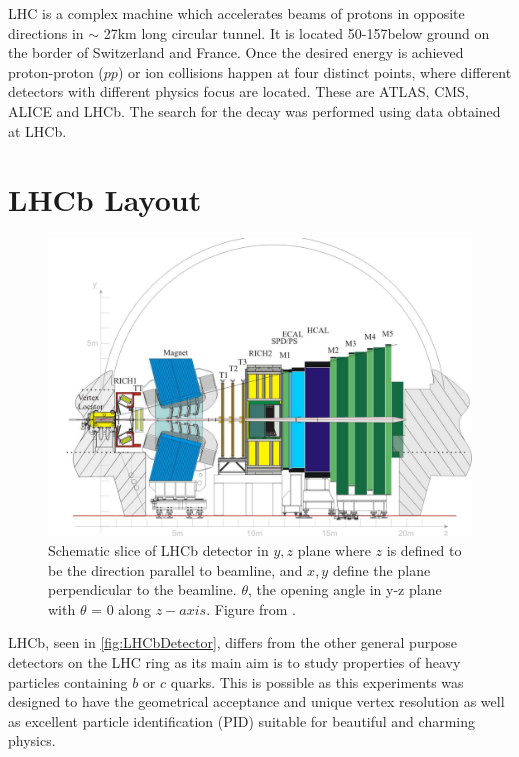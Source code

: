\Gls{LHC} is a complex machine which accelerates beams of protons in opposite directions in $\sim$ 27km long circular tunnel. It is located
50-157\m below ground on the border of Switzerland and France. Once the desired energy is achieved proton-proton ($pp$) or ion collisions happen at four distinct points, where different detectors with different physics focus are located. These are \Gls{ATLAS}, \Gls{CMS}, \Gls{ALICE} and \Gls{LHCb}. 
The search for the decay \Bmumumu was performed using data obtained at \Gls{LHCb}. 

\section{LHCb Layout }

\begin{figure}
	\centering
	\includegraphics[scale = 0.25]{figs/detector/lhcbdet.pdf}
	\caption{Schematic slice of \Gls{LHCb} detector in $y,z$ plane where $z$ is defined to be the direction parallel to beamline, and $x,y$ define the plane perpendicular to the beamline. $\theta$, the opening angle in y-z plane with $\theta$ = 0 along $z-axis$. Figure from \cite{LHCbdetector}.}
	\label{fig:LHCbDetector}
\end{figure}


\Gls{LHCb}, seen in \autoref{fig:LHCbDetector}, differs from the other general purpose detectors on the \Gls{LHC} ring as its main aim is to study properties of heavy particles containing $b$ or $c$ quarks. This is possible as this experiments was designed to have the geometrical acceptance and unique vertex resolution as well as excellent particle identification (\Gls{PID}) suitable for beautiful and charming physics.

